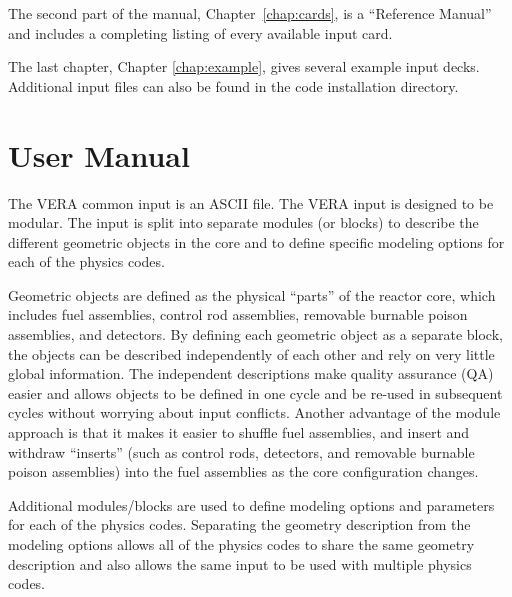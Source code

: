 \documentclass{report}
\numberwithin{equation}{section}
\begin{document}
The second part of the manual, Chapter~\ref{chap:cards}, is a ``Reference Manual'' and includes
a completing listing of every available input card.

The last chapter, Chapter \ref{chap:example}, gives several example input decks.  Additional input files can
also be found in the code installation directory.



\chapter{User Manual}
\label{chap:user}

The VERA common input is an ASCII file.
The VERA input is designed to be modular.  The input is split into separate modules
(or blocks) to describe the different geometric objects in the core and
to define specific modeling options for each of the physics codes.

Geometric objects are defined as the physical ``parts'' of the reactor core, which includes
fuel assemblies, control rod assemblies, removable burnable poison assemblies, and detectors.
By defining each geometric object as a separate block, the objects can be described
independently of each other and rely on very little global information.  The independent
descriptions make quality assurance (QA) easier and allows objects to be defined in one cycle
and be re-used in subsequent cycles without worrying about input conflicts.
Another advantage of the module approach is that it makes it easier to shuffle fuel assemblies,
and insert and withdraw ``inserts'' (such as control rods, detectors, and removable burnable
poison assemblies) into the fuel assemblies as the core configuration changes.

Additional modules/blocks are used to define modeling options and parameters for each of the physics
codes.  Separating the geometry description from the modeling options allows all of the
physics codes to share the same geometry description and also allows the same input to be
used with multiple physics codes.
\end{document}
